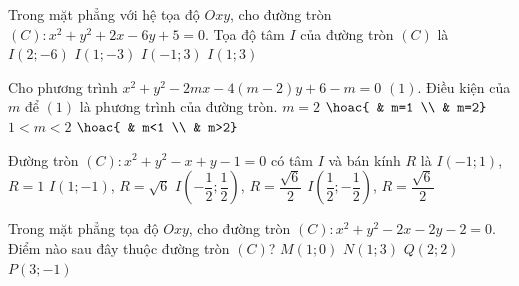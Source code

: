 \begin{ex}%
	Trong mặt phẳng với hệ tọa độ $Oxy$, cho đường tròn $(C)\colon x^2+y^2+2x-6y+5=0$.  Tọa độ tâm $I$ của đường tròn $(C)$ là
	\choice 
		{$I(2;-6)$} 
		 {$I(1;-3)$}
		 {\True $I(-1;3)$}
		{$I(1;3)$} 
\end{ex}

\begin{ex}%
	Cho phương trình $x^2+y^2-2mx-4(m-2)y+6-m=0$ $(1)$. Điều kiện của $m$ để $(1)$  là phương trình của đường tròn.
	 \choice
		{$m=2$} 
		{$\hoac{  & m=1 \\ & m=2}$}
		 {$1<m<2$}
		{\True $\hoac{  & m<1 \\ & m>2}$}
\end{ex}

\begin{ex}%
	Đường tròn $(C)\colon x^2+y^2-x+y-1=0$ có  tâm $I$ và bán kính $R$ là
	 \choice
		{$I(-1;1)$, $R=1$} 
		 {$I(1;-1)$, $R=\sqrt{6}$}
		{$I\left(-\dfrac{1}{2};\dfrac{1}{2}\right)$, $R =\dfrac{\sqrt{6}}{2}$} 
		{\True  $I\left(\dfrac{1}{2};-\dfrac{1}{2}\right)$, $R =\dfrac{\sqrt{6}}{2}$}
\end{ex}

\begin{ex}%
	Trong  mặt phẳng tọa độ $Oxy$, cho đường tròn $(C)\colon x^2+y^2-2x-2y-2=0$. Điểm nào sau đây thuộc đường tròn $(C)$?
	 \choice
		 {$M(1;0)$}
		 {\True $N(1;3)$}
		 {$Q(2;2)$}
		 {$P(3;-1)$}
\end{ex}

